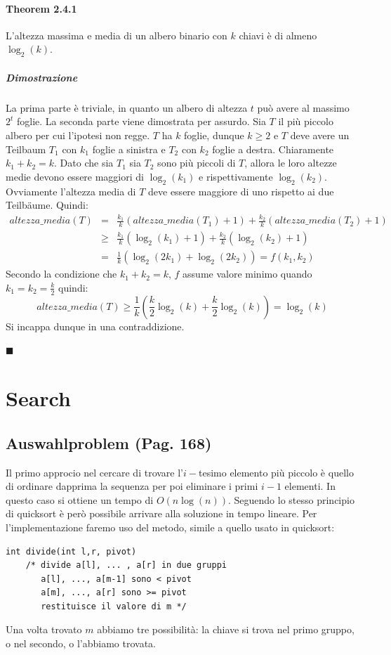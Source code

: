 \documentclass[a4paper]{book}
\newenvironment{mytheorem}[1]{\subsubsection*{Theorem #1}}{\begin{flushright}$\blacksquare$\end{flushright}}
\newcommand{\lstIndent}{4}
\begin{document}
\begin{mytheorem}{2.4.1}
L'altezza massima e media di un albero binario con $k$ chiavi è di almeno $ \log_2 (k)$.
\paragraph*{Dimostrazione}
La prima parte è triviale, in quanto un albero di altezza $t$ può avere al massimo $2^t$ foglie. La seconda parte viene dimostrata per assurdo. Sia $T$ il più piccolo albero per cui l'ipotesi non regge. $T$ ha $k$ foglie, dunque $k \geq 2$ e $T$ deve avere un Teilbaum $T_1$ con $k_1$ foglie a sinistra e $T_2$ con $k_2$ foglie a destra. Chiaramente $k_1+k_2=k$. Dato che sia $T_1$ sia $T_2$ sono più piccoli di $T$, allora le loro altezze medie devono essere maggiori di $\log_2(k_1)$ e rispettivamente $\log_2 (k_2)$. Ovviamente l'altezza media di $T$ deve essere maggiore di uno rispetto ai due Teilbäume. Quindi:
\begin{eqnarray}
 altezza\_media(T) &=&  \frac{k_1}{k}(altezza\_media(T_1)+1)+\frac{k_2}{k}(altezza\_media(T_2)+1)      \nonumber \\
   &\geq & \frac{k_1}{k}(\log_2(k_1)+1)+\frac{k_2}{k}(\log_2(k_2)+1) \nonumber \\
   &=&\frac{1}{k}(\log_2(2k_1)+\log_2(2k_2)) = f(k_1,k_2)
\end{eqnarray}
Secondo la condizione che $k_1+k_2=k$, $f$ assume valore minimo quando $k_1=k_2=\frac{k}{2}$ quindi:
$$ altezza\_media(T) \geq \frac{1}{k}\left(\frac{k}{2} \log_2(k)+\frac{k}{2} \log_2(k)\right)=\log_2 (k)$$
Si incappa dunque in una contraddizione.
\end{mytheorem}
\chapter{Search}
\section{Auswahlproblem (Pag. 168)}
Il primo approcio nel cercare di trovare l'$i-$tesimo elemento più piccolo è quello di ordinare dapprima la sequenza per poi eliminare i primi $i-1$ elementi. In questo caso si ottiene un tempo di $O(n \log (n))$. Seguendo lo stesso principio di quicksort è però possibile arrivare alla soluzione in tempo lineare. Per l'implementazione faremo uso del metodo, simile a quello usato in quicksort:
\begin{lstlisting}[tabsize=\lstIndent]
int divide(int l,r, pivot)
	/* divide a[l], ... , a[r] in due gruppi
	   a[l], ..., a[m-1] sono < pivot
	   a[m], ..., a[r] sono >= pivot
	   restituisce il valore di m */
\end{lstlisting}
Una volta trovato $m$ abbiamo tre possibilità: la chiave si trova nel primo gruppo, o nel secondo, o l'abbiamo trovata.
\end{document}
